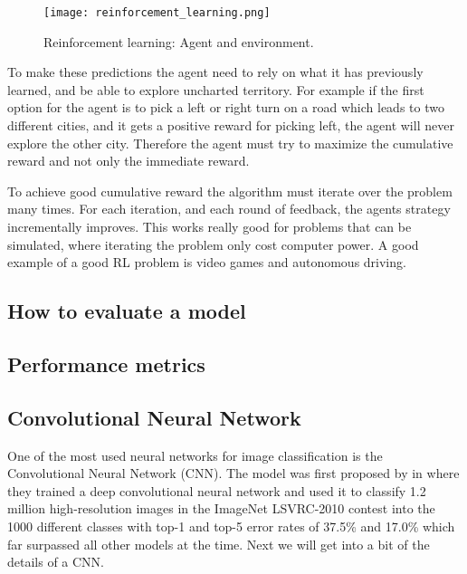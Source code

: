 \documentclass[thesis.tex]{subfiles}
\begin{document}
\begin{figure}[h] %
  \begin{center}
    \texttt{[image: reinforcement\_learning.png]}
    \caption[Reinforcement learning: Agent and environment.]{Reinforcement learning: Agent and environment.}
    \label{fig:reinforcement_learning}
  \end{center}
\end{figure}

To make these predictions the agent need to rely on what it has previously learned, and be able to explore uncharted territory. For example if the first option for the agent is to pick a left or right turn on a road which leads to two different cities, and it gets a positive reward for picking left, the agent will never explore the other city. Therefore the agent must try to maximize the cumulative reward and not only the immediate reward.

To achieve good cumulative reward the algorithm must iterate over the problem many times. For each iteration, and each round of feedback, the agents strategy incrementally improves. This works really good for problems that can be simulated, where iterating the problem only cost computer power. A good example of a good RL problem is video games and autonomous driving.


\subsection{How to evaluate a model}

\subsection{Performance metrics}

\subsection{Convolutional Neural Network} \label{convolutional_neural_network}
One of the most used neural networks for image classification is the Convolutional Neural Network (CNN). The model was first proposed by \citeauthor*{ImageNetClassification12} in \citeyear{ImageNetClassification12} \cite{ImageNetClassification12} where they trained a deep convolutional neural network and used it to classify 1.2 million high-resolution images in the ImageNet LSVRC-2010 contest into the 1000 different classes with top-1 and top-5 error rates of 37.5\% and 17.0\% which far surpassed all other models at the time. Next we will get into a bit of the details of a CNN.
\end{document}
